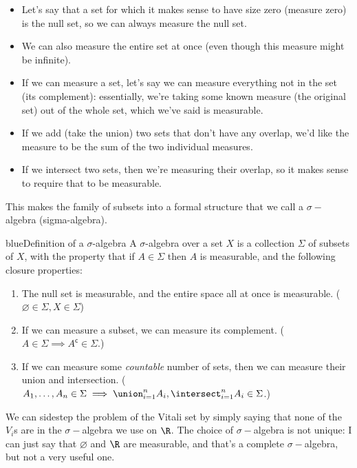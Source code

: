 \documentclass[../analysis.tex]{subfiles}
\begin{document}
    \begin{itemize}
        \item Let's say that a set for which it makes sense to have size zero (measure zero) is the null set, so we can always measure the null set.
        \item We can also measure the entire set at once (even though this measure might be infinite).
        \item If we can measure a set, let's say we can measure everything not in the set (its complement): essentially, we're taking some known measure (the original set) out of the whole set, which we've said is measurable.
        \item If we add (take the union) two sets that don't have any overlap, we'd like the measure to be the sum of the two individual measures. 
        \item If we intersect two sets, then we're measuring their overlap, so it makes sense to require that to be measurable.
    \end{itemize}
    
    This makes the family of subsets into a formal structure that we call a $\sigma-$algebra (sigma-algebra).

    \begin{mycolorbox}{blue}{Definition of a $\sigma$-algebra}
        A $\sigma$-algebra over a set $X$ is a collection $\Sigma$ of subsets of $X$, with the property that if $A \in \Sigma$ then $A$ is measurable, and the following closure properties:

        \begin{enumerate}
            \item The null set is measurable, and the entire space all at once is measurable. ($\varnothing \in \Sigma, X \in \Sigma$)
            \item If we can measure a subset, we can measure its complement. ($A \in \Sigma \implies A^{\mathsf{c}} \in \Sigma$.)
            \item If we can measure some \emph{countable} number of sets, then we can measure their union and intersection. ($A_1, \dots, A_n \in \Sigma \implies \union_{i=1}^n A_i, \intersect_{i=1}^n A_i \in \Sigma$.)
        \end{enumerate}
    \end{mycolorbox}

    We can sidestep the problem of the Vitali set by simply saying that none of the $V_i$s are in the $\sigma-$algebra we use on $\R$. The choice of $\sigma-$algebra is not unique: I can just say that $\varnothing$ and $\R$ are measurable, and that's a complete $\sigma-$algebra, but not a very useful one.
\end{document}
